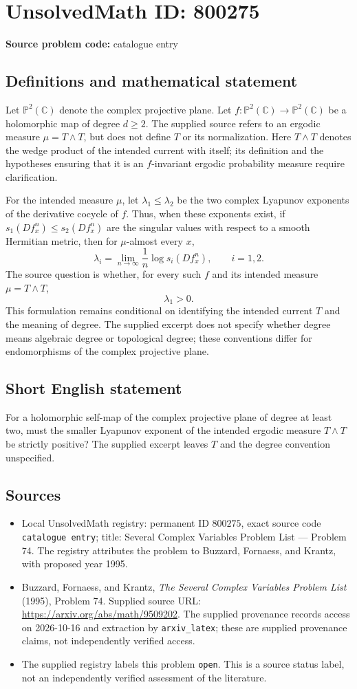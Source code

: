 \documentclass[11pt]{article}
\newcommand{\C}{\mathbb{C}}
\newcommand{\PP}{\mathbb{P}}
\begin{document}
\section*{UnsolvedMath ID: 800275}
\textbf{Source problem code:} catalogue entry
\subsection{Definitions and mathematical statement}
Let \(\PP^2(\C)\) denote the complex projective plane. Let \(f:\PP^2(\C)\to\PP^2(\C)\) be a holomorphic map of degree \(d\geq 2\). The supplied source refers to an ergodic measure \(\mu=T\wedge T\), but does not define \(T\) or its normalization. Here \(T\wedge T\) denotes the wedge product of the intended current with itself; its definition and the hypotheses ensuring that it is an \(f\)-invariant ergodic probability measure require clarification.

For the intended measure \(\mu\), let \(\lambda_1\leq\lambda_2\) be the two complex Lyapunov exponents of the derivative cocycle of \(f\). Thus, when these exponents exist, if \(s_1(Df_x^n)\leq s_2(Df_x^n)\) are the singular values with respect to a smooth Hermitian metric, then for \(\mu\)-almost every \(x\),
\[
\lambda_i=\lim_{n\to\infty}\frac{1}{n}\log s_i(Df_x^n),\qquad i=1,2.
\]
The source question is whether, for every such \(f\) and its intended measure \(\mu=T\wedge T\),
\[
\lambda_1>0.
\]
This formulation remains conditional on identifying the intended current \(T\) and the meaning of degree. The supplied excerpt does not specify whether degree means algebraic degree or topological degree; these conventions differ for endomorphisms of the complex projective plane.
\subsection{Short English statement}
For a holomorphic self-map of the complex projective plane of degree at least two, must the smaller Lyapunov exponent of the intended ergodic measure \(T\wedge T\) be strictly positive? The supplied excerpt leaves \(T\) and the degree convention unspecified.
\subsection{Sources}
\begin{itemize}
\item Local UnsolvedMath registry: permanent ID \(800275\), exact source code \texttt{catalogue entry}; title: Several Complex Variables Problem List --- Problem 74. The registry attributes the problem to Buzzard, Fornaess, and Krantz, with proposed year 1995.
\item Buzzard, Fornaess, and Krantz, \emph{The Several Complex Variables Problem List} (1995), Problem 74. Supplied source URL: \url{https://arxiv.org/abs/math/9509202}. The supplied provenance records access on 2026-10-16 and extraction by \texttt{arxiv\_latex}; these are supplied provenance claims, not independently verified access.
\item The supplied registry labels this problem \texttt{open}. This is a source status label, not an independently verified assessment of the literature.
\end{itemize}
\end{document}

